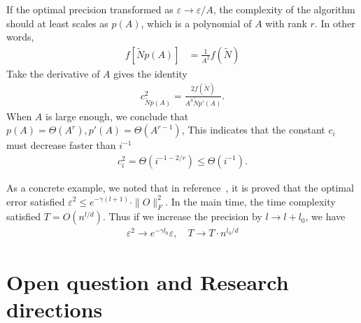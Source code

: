 \documentclass[aps,%
twocolumn,%
floatfix,%
pra,%
amsfonts,%
longbibliography,%
groupedaddress,%
superscriptaddress]{revtex4-2}%
\newcommand{\1}{\mathbbm{1}}
\begin{document}
If the optimal precision transformed as $\varepsilon \to \varepsilon/A$, the complexity of the algorithm should at least scales as $p(A)$, which is a polynomial of $A$ with rank $r$. In other words,
\begin{align}
    f[\tilde N p(A)] &= \frac{1}{A^2} f(\tilde N)
\end{align}
Take the derivative of $A$ gives the identity
\begin{align}
    c^2_{\tilde N p(A)} = \frac{2 f(\tilde N)}{A^3  \tilde N p'(A)}.
\end{align}
When $A$ is large enough, we conclude that $p(A)= \Theta(A^r), p'(A)= \Theta(A^{r-1})$, This indicates that the constant $c_i$ must decrease faster than $i^{-1}$
\begin{align}
    c_{i}^2 = \Theta(i^{-1 -2/r}) \leq \Theta(i^{-1}).
\end{align}

As a concrete example, we noted that in reference~\cite{schuster2024polynomial}, it is proved that the optimal error satisfied $\varepsilon^2 \leq e^{-\gamma(l+1)} \cdot \|O\|_F^2$. In the main time, the time complexity satisfied $T = O(n^{l/d})$. Thus if we increase the precision by $l \to l+ l_0$, we have
\begin{align}
    \varepsilon^2 \to e^{-\gamma l_0}\varepsilon, \quad T \to T\cdot n^{l_0/d}
\end{align}
\section{Open question and Research directions}


\end{document}
